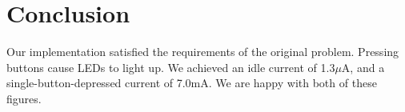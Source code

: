 \chapter{Conclusion}
Our implementation satisfied the requirements of the original problem. Pressing buttons cause LEDs to light up. We achieved an idle current of 1.3$\mu$A, and a single-button-depressed current of 7.0mA. We are happy with both of these figures.